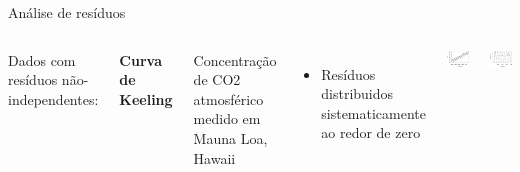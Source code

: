\documentclass{beamer}\usepackage[]{graphicx}\usepackage[]{color}
\newenvironment{knitrout}{}{} %
\renewenvironment{knitrout}{\setlength{\topsep}{0mm}}{}
\begin{document}
\begin{frame}{Análise de resíduos}

\begin{columns}[c]

\small

Dados com resíduos não-independentes:

\bigskip
\textbf{Curva de Keeling }\pause

Concentração de CO2 atmosférico medido em Mauna Loa, Hawaii
\bigskip
\begin{itemize}
\item Resíduos distribuidos sistematicamente ao redor de zero
\end{itemize}


\begin{knitrout}
\color{fgcolor}
\includegraphics[width=1\linewidth]{figure/r8-1} 

\includegraphics[width=1\linewidth]{figure/r8-2} 

\end{knitrout}
\end{columns}

\end{frame}
\end{document}
